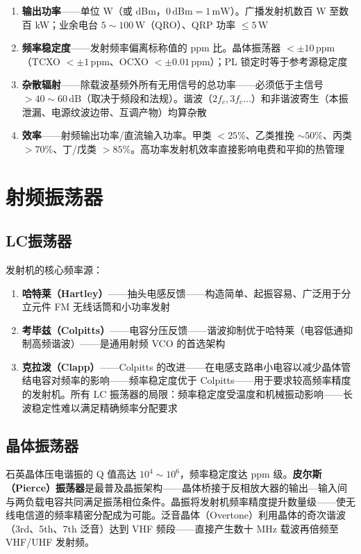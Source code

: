 \documentclass[12pt,UTF8]{ctexbook}
\begin{document}
\begin{enumerate}
\item \textbf{输出功率}——单位 W（或 dBm，$0\,\mathrm{dBm}=1\,\mathrm{mW}$）。广播发射机数百 W 至数百 kW；业余电台 $5\sim100\,\mathrm{W}$（QRO）、QRP 功率 $\le5\,\mathrm{W}$
\item \textbf{频率稳定度}——发射频率偏离标称值的 ppm 比。晶体振荡器 $<\pm10\,\mathrm{ppm}$（TCXO $<\pm1\,\mathrm{ppm}$、OCXO $<\pm0.01\,\mathrm{ppm}$）；PL 锁定时等于参考源稳定度
\item \textbf{杂散辐射}——除载波基频外所有无用信号的总功率——必须低于主信号 $>40\sim60\,\mathrm{dB}$（取决于频段和法规）。谐波（$2f_c,3f_c\ldots$）和非谐波寄生（本振泄漏、电源纹波边带、互调产物）均算杂散
\item \textbf{效率}——射频输出功率/直流输入功率。甲类 $<25\%$、乙类推挽 $\sim50\%$、丙类 $>70\%$、丁/戊类 $>85\%$。高功率发射机效率直接影响电费和平抑的热管理
\end{enumerate}

\section{射频振荡器}
\label{sec:rf_oscillator}

\subsection{LC振荡器}

发射机的核心频率源：
\begin{enumerate}
\item \textbf{哈特莱（Hartley）}——抽头电感反馈——构造简单、起振容易、广泛用于分立元件 FM 无线话筒和小功率发射
\item \textbf{考毕兹（Colpitts）}——电容分压反馈——谐波抑制优于哈特莱（电容低通抑制高频谐波）——是通用射频 VCO 的首选架构
\item \textbf{克拉泼（Clapp）}——Colpitts 的改进——在电感支路串小电容以减少晶体管结电容对频率的影响——频率稳定度优于 Colpitts——用于要求较高频率精度的发射机。所有 LC 振荡器的局限：频率稳定度受温度和机械振动影响——长波稳定性难以满足精确频率分配要求
\end{enumerate}

\subsection{晶体振荡器}

石英晶体压电谐振的 Q 值高达 $10^4\sim10^6$，频率稳定度达 ppm 级。\textbf{皮尔斯（Pierce）振荡器}是最普及晶振架构——晶体桥接于反相放大器的输出—输入间与两负载电容共同满足振荡相位条件。晶振将发射机频率精度提升数量级——使无线电信道的频率精密分配成为可能。泛音晶体（Overtone）利用晶体的奇次谐波（3rd、5th、7th 泛音）达到 VHF 频段——直接产生数十 MHz 载波再倍频至 VHF/UHF 发射频。
\end{document}
